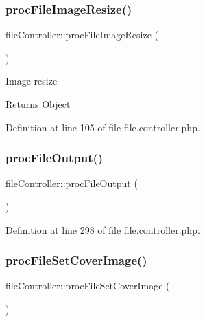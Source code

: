 \subsubsection{\texorpdfstring{proc\+File\+Image\+Resize()}{procFileImageResize()}}
{\footnotesize\ttfamily file\+Controller\+::proc\+File\+Image\+Resize (\begin{DoxyParamCaption}{ }\end{DoxyParamCaption})}

Image resize

\begin{DoxyReturn}{Returns}
\hyperlink{classObject}{Object} 
\end{DoxyReturn}


Definition at line 105 of file file.\+controller.\+php.

\mbox{\label{classfileController_a21d4fb5d44f6f078cc9d63b89e642dce}} 
\subsubsection{\texorpdfstring{proc\+File\+Output()}{procFileOutput()}}
{\footnotesize\ttfamily file\+Controller\+::proc\+File\+Output (\begin{DoxyParamCaption}{ }\end{DoxyParamCaption})}



Definition at line 298 of file file.\+controller.\+php.

\mbox{\label{classfileController_a54e65e695efa22b2a9507fd52e44d601}} 
\subsubsection{\texorpdfstring{proc\+File\+Set\+Cover\+Image()}{procFileSetCoverImage()}}
{\footnotesize\ttfamily file\+Controller\+::proc\+File\+Set\+Cover\+Image (\begin{DoxyParamCaption}{ }\end{DoxyParamCaption})}



